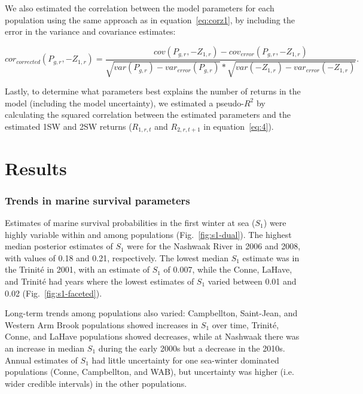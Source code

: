 \documentclass[12pt]{article}
\newcommand{\So}{$S_{1}$\xspace}
\begin{document}
We also estimated the correlation between the model parameters for each population using
the same approach as in equation~\ref{eq:corz1},
by including the error in the variance and covariance estimates:

\begin{equation}
cor_{corrected}(P_{g,r},-Z_{1,r}) = \frac{cov(P_{g,r}, -Z_{1,r}) - cov_{error}(P_{g,r}, -Z_{1,r})}
{\sqrt{var(P_{g,r})- var_{error}(P_{g,r})}*\sqrt{var(-Z_{1,r}) - var_{error}(-Z_{1,r})}}\label{eq:corparam}.
\end{equation}

Lastly, to determine what parameters best explains the number of returns in
the model (including the model uncertainty), we estimated a pseudo-$R^2$ by
calculating the squared correlation between the estimated parameters and the
estimated 1SW and 2SW returns ($R_{1,r,t}$ and $R_{2,r,t+1}$ in
equation~\ref{eq:4}).



\section*{Results}


\subsubsection*{Trends in marine survival parameters}

Estimates of marine survival probabilities in the first winter at sea (\So) were 
highly variable within and among populations
(Fig.~\ref{fig:s1-dual}). The highest median posterior estimates of \So
were for the Nashwaak River in 2006 and 2008, with values of 0.18 and 0.21,
respectively. The lowest median \So estimate was in the Trinit\'{e} in 2001,
with an estimate of \So of 0.007, while the Conne, LaHave, and Trinit\'{e} had
years where the lowest estimates of \So varied between 0.01 and 0.02 (Fig.~\ref{fig:s1-faceted}).

Long-term trends among populations also varied: Campbellton,
Saint-Jean, and Western Arm Brook populations showed increases in \So
over time, Trinit\'{e}, Conne, and LaHave populations showed decreases,
while at Nashwaak there was an increase in median \So during the early
2000s but a decrease in the 2010s. Annual estimates of \So had little
uncertainty for one sea-winter dominated populations (Conne, Campbellton, and
WAB), but uncertainty was higher (i.e. wider credible intervals) in the other
populations.
\end{document}
